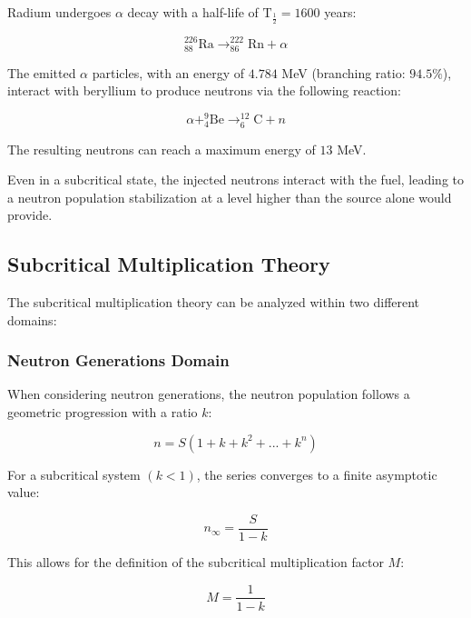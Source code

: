 Radium undergoes \(\alpha\) decay with a half-life of \(\text{T}_{\frac{1}{2}} = 1600\) years:

\begin{equation}
^{226}_{88}\text{Ra} \rightarrow ^{222}_{86}\text{Rn} + \alpha    
\end{equation}

The emitted \(\alpha\) particles, with an energy of \(4.784\) MeV (branching ratio: \(94.5\%\)), interact with beryllium to produce neutrons via the following reaction:

\begin{equation}
\alpha + ^9_4\text{Be} \rightarrow ^{12}_6\text{C} + n
\end{equation}

The resulting neutrons can reach a maximum energy of \(13\) MeV.


Even in a subcritical state, the injected neutrons interact with the fuel, leading to a neutron population stabilization at a level higher than the source alone would provide.

\subsection{Subcritical Multiplication Theory}

The subcritical multiplication theory can be analyzed within two different domains:

\subsubsection{Neutron Generations Domain}

When considering neutron generations, the neutron population follows a geometric progression with a ratio $ k $:

\begin{equation}
n = S (1 + k + k^2 + ... + k^n)
\end{equation}

For a subcritical system $( k < 1 )$, the series converges to a finite asymptotic value:

\begin{equation}
n_{\infty} = \frac{S}{1 - k}
\end{equation}

This allows for the definition of the subcritical multiplication factor $ M $:

\begin{equation}
M = \frac{1}{1 - k}
\end{equation}


